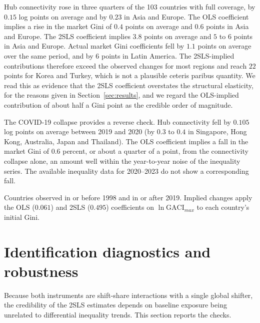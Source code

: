 \documentclass[12pt]{article}
\begin{document}
Hub connectivity rose in three quarters of the 103 countries with full coverage, by $0.15$ log points on average and by $0.23$ in Asia and Europe. The OLS coefficient implies a rise in the market Gini of $0.4$ points on average and $0.6$ points in Asia and Europe. The 2SLS coefficient implies $3.8$ points on average and $5$ to $6$ points in Asia and Europe. Actual market Gini coefficients fell by $1.1$ points on average over the same period, and by $6$ points in Latin America. The 2SLS-implied contributions therefore exceed the observed changes for most regions and reach $22$ points for Korea and Turkey, which is not a plausible ceteris paribus quantity. We read this as evidence that the 2SLS coefficient overstates the structural elasticity, for the reasons given in Section~\ref{sec:results}, and we regard the OLS-implied contribution of about half a Gini point as the credible order of magnitude.

The COVID-19 collapse provides a reverse check. Hub connectivity fell by $0.105$ log points on average between 2019 and 2020 (by $0.3$ to $0.4$ in Singapore, Hong Kong, Australia, Japan and Thailand). The OLS coefficient implies a fall in the market Gini of $0.6$ percent, or about a quarter of a point, from the connectivity collapse alone, an amount well within the year-to-year noise of the inequality series. The available inequality data for 2020--2023 do not show a corresponding fall.

\begin{table}[H]\centering\caption{Implied contribution of hub-connectivity growth to the market Gini, first to last observation.}\label{tab:contrib}
\begin{threeparttable}\small
\begin{tablenotes}\footnotesize\item Countries observed in or before 1998 and in or after 2019. Implied changes apply the OLS ($0.061$) and 2SLS ($0.495$) coefficients on $\ln\mathrm{GACI}_{max}$ to each country's initial Gini.\end{tablenotes}\end{threeparttable}\end{table}

\section{Identification diagnostics and robustness}
\label{sec:diag}
Because both instruments are shift-share interactions with a single global shifter, the credibility of the 2SLS estimates depends on baseline exposure being unrelated to differential inequality trends. This section reports the checks.
\end{document}
